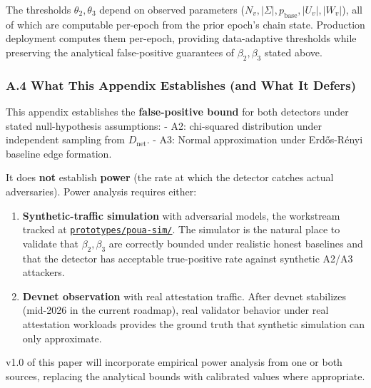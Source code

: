 \documentclass[
  11pt,
]{article}
\providecommand{\tightlist}{%
  \setlength{\itemsep}{0pt}\setlength{\parskip}{0pt}}
\begin{document}
The thresholds \(\theta_2, \theta_3\) depend on observed parameters
(\(N_v, |\Sigma|, p_{\text{base}}, |U_v|, |W_v|\)), all of which are
computable per-epoch from the prior epoch's chain state. Production
deployment computes them per-epoch, providing data-adaptive thresholds
while preserving the analytical false-positive guarantees of
\(\beta_2, \beta_3\) stated above.

\subsubsection{A.4 What This Appendix Establishes (and What It
Defers)}\label{a.4-what-this-appendix-establishes-and-what-it-defers}

This appendix establishes the \textbf{false-positive bound} for both
detectors under stated null-hypothesis assumptions: - A2: chi-squared
distribution under independent sampling from \(D_{\text{net}}\). - A3:
Normal approximation under Erdős-Rényi baseline edge formation.

It does \textbf{not} establish \textbf{power} (the rate at which the
detector catches actual adversaries). Power analysis requires either:

\begin{enumerate}
\def\labelenumi{\arabic{enumi}.}
\tightlist
\item
  \textbf{Synthetic-traffic simulation} with adversarial models, the
  workstream tracked at
  \href{https://github.com/ligate-io/ligate-research/tree/main/prototypes/poua-sim}{\texttt{prototypes/poua-sim/}}.
  The simulator is the natural place to validate that
  \(\beta_2, \beta_3\) are correctly bounded under realistic honest
  baselines and that the detector has acceptable true-positive rate
  against synthetic A2/A3 attackers.
\item
  \textbf{Devnet observation} with real attestation traffic. After
  devnet stabilizes (mid-2026 in the current roadmap), real validator
  behavior under real attestation workloads provides the ground truth
  that synthetic simulation can only approximate.
\end{enumerate}

v1.0 of this paper will incorporate empirical power analysis from one or
both sources, replacing the analytical bounds with calibrated values
where appropriate.
\end{document}
